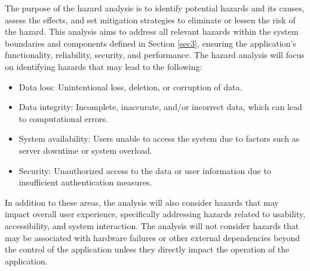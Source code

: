 \documentclass{article}
\begin{document}
The purpose of the hazard analysis is to identify potential hazards and its
causes, assess the effects, and set mitigation strategies to eliminate or lessen
the risk of the hazard. This analysis aims to address all relevant hazards
within the system boundaries and components defined in Section \ref{sec3},
ensuring the application's functionality, reliability, security, and performance. 
The hazard analysis will focus on identifying hazards that may lead to the
following:
\begin{itemize}
    \item Data loss: Unintentional loss, deletion, or corruption of data.
    \item Data integrity: Incomplete, inaccurate, and/or incorrect data, which
    can lead to computational errors.
    \item System availability: Users unable to access the system due to
    factors such as server downtime or system overload.
    \item Security: Unauthorized access to the data or user information due to
    insufficient authentication measures.
\end{itemize}
In addition to these areas, the analysis will also consider hazards that may
impact overall user experience, specifically addressing hazards related to
usability, accessibility, and system interaction.
The analysis will not consider hazards that may be associated with hardware
failures or other external dependencies beyond the control of the application
unless they directly impact the operation of the application. 
\end{document}
